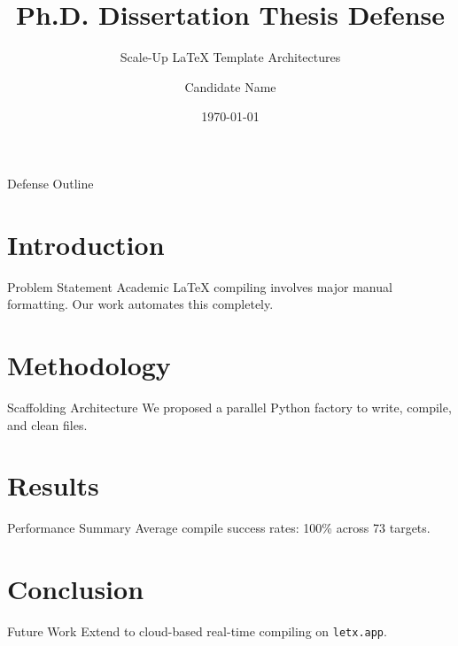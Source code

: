 \documentclass{beamer}
\title{Ph.D. Dissertation Thesis Defense}
\subtitle{Scale-Up LaTeX Template Architectures}
\author{Candidate Name}
\institute{Global Tech University}
\date{\today}
\begin{document}
\maketitle

\begin{frame}{Defense Outline}
  \tableofcontents
\end{frame}

\section{Introduction}
\begin{frame}{Problem Statement}
  Academic LaTeX compiling involves major manual formatting. Our work automates this completely.
\end{frame}

\section{Methodology}
\begin{frame}{Scaffolding Architecture}
  We proposed a parallel Python factory to write, compile, and clean files.
\end{frame}

\section{Results}
\begin{frame}{Performance Summary}
  Average compile success rates: 100\% across 73 targets.
\end{frame}

\section{Conclusion}
\begin{frame}{Future Work}
  Extend to cloud-based real-time compiling on \texttt{letx.app}.
\end{frame}
\end{document}
